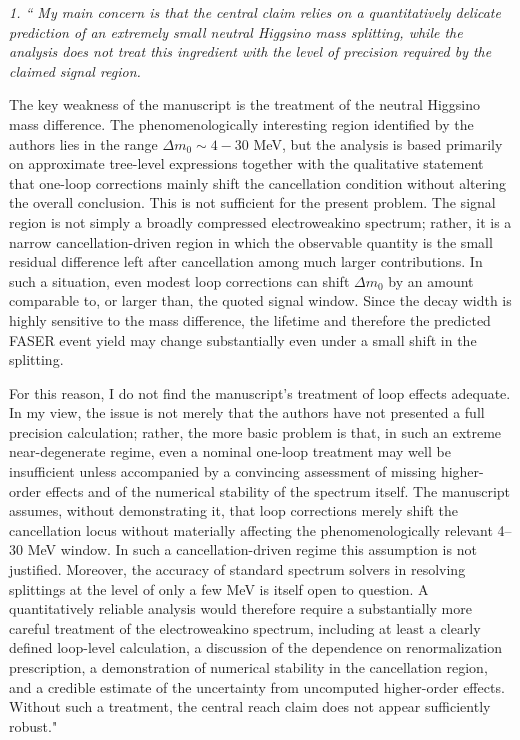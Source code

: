 \documentclass[12pt]{article}
\begin{document}
{\it 1. `` My main concern is that the central
claim relies on a quantitatively delicate prediction of an extremely small neutral Higgsino mass splitting, while the analysis does not treat this ingredient with the level of precision required by the claimed signal region.

\quad The key weakness of the manuscript is the treatment of the neutral Higgsino mass difference. The phenomenologically interesting region identified by the authors lies in the range $\Delta m_0 \sim 4-30$ MeV, but the analysis is based primarily on approximate tree-level expressions together with the qualitative statement that one-loop corrections mainly shift the cancellation condition without altering the overall conclusion. This is not sufficient for the present problem. The signal region is not simply a broadly compressed electroweakino spectrum; rather, it is a narrow cancellation-driven region in which the observable quantity is the small residual difference left after cancellation among much larger contributions. In such a situation, even modest loop corrections can shift $\Delta m_0$ by an amount comparable to, or larger than, the quoted signal window. Since the decay width is highly sensitive to the mass difference, the lifetime and therefore the predicted FASER event yield may change substantially even under a small shift in the splitting.

\quad For this reason, I do not find the manuscript’s treatment of loop effects adequate. In my view, the issue is not merely that the authors have not presented a full precision calculation;
rather, the more basic problem is that, in such an extreme near-degenerate regime, even a
nominal one-loop treatment may well be insufficient unless accompanied by a convincing assessment of missing higher-order effects and of the numerical stability of the spectrum itself. The manuscript assumes, without demonstrating it, that loop corrections merely shift the cancellation locus without materially affecting the phenomenologically relevant 4–30 MeV window. In such a cancellation-driven regime this assumption is not justified. Moreover, the accuracy of standard spectrum solvers in resolving splittings at the level of only a few MeV is itself open to question. A quantitatively reliable analysis would therefore require a substantially more careful treatment of the electroweakino spectrum, including at least a clearly defined loop-level calculation, a discussion of the dependence on renormalization prescription, a demonstration of numerical stability in the cancellation region, and a credible estimate of the uncertainty from uncomputed higher-order effects. Without such a treatment, the central reach claim does not appear sufficiently robust." } \\
\end{document}
